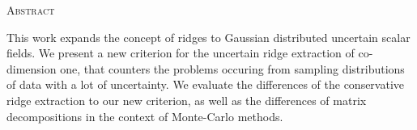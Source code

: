 \begin{center}
  \textsc{Abstract}
\end{center}
%
\noindent
%
This work expands the concept of ridges to Gaussian distributed
uncertain scalar fields. We present a new criterion for the uncertain
ridge extraction of co-dimension one, that counters the problems
occuring from sampling distributions of data with a lot of uncertainty.
We evaluate the differences of the conservative ridge extraction to our
new criterion, as well as the differences of matrix decompositions in
the context of Monte-Carlo methods.
